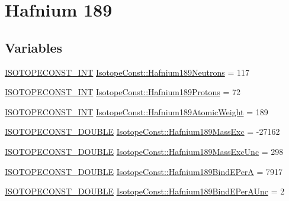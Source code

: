 \hypertarget{group___isotope_const-_hafnium-_hf189}{}\section{Hafnium 189}
\label{group___isotope_const-_hafnium-_hf189}
\subsection*{Variables}
\begin{DoxyCompactItemize}
\item 
\mbox{\hyperlink{group___isotope_const-_macros_ga5f18360b3e99483a35c32d789e62621c}{I\+S\+O\+T\+O\+P\+E\+C\+O\+N\+S\+T\+\_\+\+I\+NT}} \mbox{\hyperlink{group___isotope_const-_hafnium-_hf189_ga496da2497e525b00cecf029d98fb36ed}{Isotope\+Const\+::\+Hafnium189\+Neutrons}} = 117
\item 
\mbox{\hyperlink{group___isotope_const-_macros_ga5f18360b3e99483a35c32d789e62621c}{I\+S\+O\+T\+O\+P\+E\+C\+O\+N\+S\+T\+\_\+\+I\+NT}} \mbox{\hyperlink{group___isotope_const-_hafnium-_hf189_ga267e3015fcdee9813cf5cfc4f7dcdb2d}{Isotope\+Const\+::\+Hafnium189\+Protons}} = 72
\item 
\mbox{\hyperlink{group___isotope_const-_macros_ga5f18360b3e99483a35c32d789e62621c}{I\+S\+O\+T\+O\+P\+E\+C\+O\+N\+S\+T\+\_\+\+I\+NT}} \mbox{\hyperlink{group___isotope_const-_hafnium-_hf189_gaa1ab9a8add36ec927134238f1566ce43}{Isotope\+Const\+::\+Hafnium189\+Atomic\+Weight}} = 189
\item 
\mbox{\hyperlink{group___isotope_const-_macros_ga8f45a7272ce02c0b4c65c44636ed719a}{I\+S\+O\+T\+O\+P\+E\+C\+O\+N\+S\+T\+\_\+\+D\+O\+U\+B\+LE}} \mbox{\hyperlink{group___isotope_const-_hafnium-_hf189_gab0d2a6bbcaebaac4053ff9edd7b053b5}{Isotope\+Const\+::\+Hafnium189\+Mass\+Exc}} = -\/27162
\item 
\mbox{\hyperlink{group___isotope_const-_macros_ga8f45a7272ce02c0b4c65c44636ed719a}{I\+S\+O\+T\+O\+P\+E\+C\+O\+N\+S\+T\+\_\+\+D\+O\+U\+B\+LE}} \mbox{\hyperlink{group___isotope_const-_hafnium-_hf189_gae0599f84cd210ef1fb2b116feebeb3e0}{Isotope\+Const\+::\+Hafnium189\+Mass\+Exc\+Unc}} = 298
\item 
\mbox{\hyperlink{group___isotope_const-_macros_ga8f45a7272ce02c0b4c65c44636ed719a}{I\+S\+O\+T\+O\+P\+E\+C\+O\+N\+S\+T\+\_\+\+D\+O\+U\+B\+LE}} \mbox{\hyperlink{group___isotope_const-_hafnium-_hf189_gaf21e41a17ae5681e6a2541403bd5778d}{Isotope\+Const\+::\+Hafnium189\+Bind\+E\+PerA}} = 7917
\item 
\mbox{\hyperlink{group___isotope_const-_macros_ga8f45a7272ce02c0b4c65c44636ed719a}{I\+S\+O\+T\+O\+P\+E\+C\+O\+N\+S\+T\+\_\+\+D\+O\+U\+B\+LE}} \mbox{\hyperlink{group___isotope_const-_hafnium-_hf189_ga84cb4908e32fc9a98a0e080dd2dd4e07}{Isotope\+Const\+::\+Hafnium189\+Bind\+E\+Per\+A\+Unc}} = 2

\end{DoxyCompactItemize}
